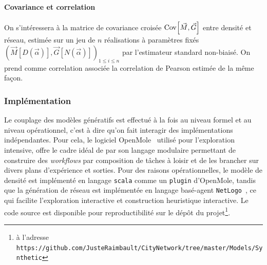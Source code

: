 \paragraph{Covariance et correlation}

On s'intéressera à la matrice de covariance croisée $\operatorname{Cov}\!\left[\vec{M},\vec{G}\right]$ entre densité et réseau, estimée sur un jeu de $n$ réalisations à paramètres fixés $(\vec{M}\left[D(\vec{\alpha})\right],\vec{G}\left[N(\vec{\alpha})\right])_{1\leq i\leq n}$ par l'estimateur standard non-biaisé. On prend comme correlation associée la correlation de Pearson estimée de la même façon.



\subsubsection{Implémentation}

Le couplage des modèles génératifs est effectué à la fois au niveau formel et au niveau opérationnel, c'est à dire qu'on fait interagir des implémentations indépendantes. Pour cela, le logiciel OpenMole~\cite{reuillon2013openmole} utilisé pour l'exploration intensive, offre le cadre idéal de par son langage modulaire permettant de construire des \emph{workflows} par composition de tâches à loisir et de les brancher sur divers plans d'expérience et sorties. Pour des raisons opérationnelles, le modèle de densité est implémenté en langage \texttt{scala} comme un \texttt{plugin} d'OpenMole, tandis que la génération de réseau est implémentée en langage basé-agent \texttt{NetLogo}~\cite{wilensky1999netlogo}, ce qui facilite l'exploration interactive et construction heuristique interactive. Le code source est disponible pour reproductibilité sur le dépôt du projet\footnote{à l'adresse \texttt{https://github.com/JusteRaimbault/CityNetwork/tree/master/Models/Synthetic}}.






